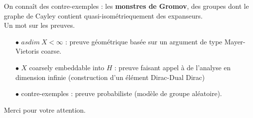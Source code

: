 \documentclass{beamer}
\begin{document}
\begin{frame}
On connaît des contre-exemples : les \textbf{monstres de Gromov}, des groupes dont le graphe de Cayley contient quasi-isométriequement des expanseurs.\\
Un mot sur les preuves.
\begin{itemize}
\item[$\bullet$]  $asdim\ X<\infty$ : preuve géométrique basée sur un argument de type Mayer-Vietoris coarse.
\item[$\bullet$]  $X$ coarsely embeddable into $H$ : preuve faisant appel à de l'analyse en dimension infinie (construction d'un élément Dirac-Dual Dirac)
\item[$\bullet$] contre-exemples : preuve probabiliste (modèle de groupe aléatoire).
\end{itemize}
\end{frame}

\begin{frame}
Merci pour votre attention.
\end{frame}
\end{document}
